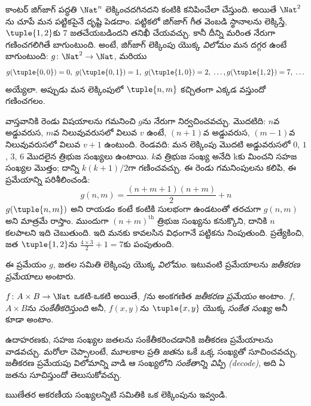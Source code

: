 \documentclass[../../../include/open-logic-section]{subfiles}
\begin{document}

\begin{explain}
కాంటర్ జిగ్‌జాగ్ పద్ధతి $\Nat^n$ లెక్కించదగినదని కంటికి కనిపించేలా
చేస్తుంది. అయితే $\Nat^2$ను చూపే మన పట్టికపైనే దృష్టి పెడదాం.
పట్టికలో జిగ్‌జాగ్ గీత వెంబడి స్థానాలను లెక్కిస్తే,
$\tuple{1,2}$కు $7$ జతచేయబడిందని తనిఖీ చేయవచ్చు. కానీ దీన్ని మరింత
నేరుగా గణించగలిగితే బాగుంటుంది. అంటే, జిగ్‌జాగ్ లెక్కింపు యొక్క
\emph{విలోమం} మన దగ్గర ఉంటే బాగుంటుంది: $g\colon \Nat^2 \to \Nat$,
మరియు
\[
g(\tuple{0,0}) = 0, \;
g(\tuple{0,1}) = 1, \;
g(\tuple{1,0}) = 2, \; \dots,
g(\tuple{1,2}) = 7, \; \dots
\]
అయ్యేలా. అప్పుడు మన లెక్కింపులో $\tuple{n, m}$ కచ్చితంగా ఎక్కడ
వస్తుందో గణించగలం.

వాస్తవానికి రెండు విషయాలను గమనించి $g$ను నేరుగా నిర్వచించవచ్చు.
మొదటిది: $n$వ అడ్డువరుస, $m$వ నిలువువరుసలో విలువ $v$ ఉంటే,
$(n+1)$వ అడ్డువరుస, $(m-1)$వ నిలువువరుసలో విలువ $v + 1$ ఉంటుంది.
రెండవది: మన లెక్కింపు మొదటి అడ్డువరుసలో $0$, $1$, $3$, $6$ మొదలైన
త్రిభుజ సంఖ్యలు ఉంటాయి. $k$వ త్రిభుజ సంఖ్య అనేది kకు మించని
సహజ సంఖ్యల మొత్తం; దాన్ని $k(k+1)/2$గా గణించవచ్చు. ఈ రెండు
గమనింపులను కలిపి, ఈ ప్రమేయాన్ని పరిశీలించండి:
\[
  g(n,m) = \frac{(n+m+1)(n+m)}{2} + n
\]
$g(\tuple{n, m})$ అని రాయడం కంటే కంటికి సులభంగా ఉండటంతో తరచుగా
$g(n, m)$ అని మాత్రమే రాస్తాం. ముందుగా $(n+m)^\text{th}$ త్రిభుజ
సంఖ్యను కనుక్కొని, దానికి $n$ కలపాలని ఇది చెబుతుంది. ఇది మనకు
కావలసిన విధంగానే పట్టికను నింపుతుంది. ప్రత్యేకించి, జత
$\tuple{1, 2}$ను $\frac{4 \times 3}{2} + 1 = 7$కు పంపుతుంది.

ఈ ప్రమేయం $g$, జతల సమితి లెక్కింపు యొక్క \emph{విలోమం}. ఇటువంటి
ప్రమేయాలను \emph{జతీకరణ ప్రమేయాలు} అంటారు.
\end{explain}

\begin{defn}[జతీకరణ ప్రమేయం]
$f\colon A \times B \to \Nat$ ఒకటి-ఒకటి అయితే, $f$ను అంకగణిత
\emph{జతీకరణ ప్రమేయం} అంటాం. $f$, $A \times B$ను
\emph{సంకేతీకరిస్తుంది} అనీ, $f(x,y)$ను $\tuple{x,y}$ యొక్క
\emph{సంకేత సంఖ్య} అనీ కూడా అంటాం.
\end{defn}

\begin{explain}
ఉదాహరణకు, సహజ సంఖ్యల జతలను సంకేతీకరించడానికి జతీకరణ ప్రమేయాలను
వాడవచ్చు. మరోలా చెప్పాలంటే, మూలకాల ప్రతి \emph{జత}ను ఒకే
\emph{ఒక్క} సంఖ్యతో సూచించవచ్చు. జతీకరణ ప్రమేయపు విలోమాన్ని వాడి
ఆ సంఖ్యలోని \emph{సంకేతాన్ని విప్పి (decode)}, అది ఏ జతను సూచిస్తుందో తెలుసుకోవచ్చు.
\end{explain}

\begin{prob}
ఋణేతర అకరణీయ సంఖ్యలన్నిటి సమితికి ఒక లెక్కింపును ఇవ్వండి.
\end{prob}
\end{document}
